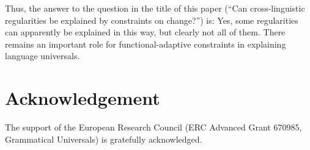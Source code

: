 \documentclass[output=paper]{langsci/langscibook}
\begin{document}
Thus, the answer to the question in the title of this paper (“Can cross-linguistic regularities be explained by constraints on change?”) is: Yes, some regularities can apparently be explained in this way, but clearly not all of them. There remains an important role for functional-adaptive constraints in explaining language universals.

\section*{Acknowledgement}

The support of the European Research Council (ERC Advanced Grant 670985, Grammatical Universals) is gratefully acknowledged. 

\sloppy
\printbibliography[heading=subbibliography,notkeyword=this] 
 
\end{document}
